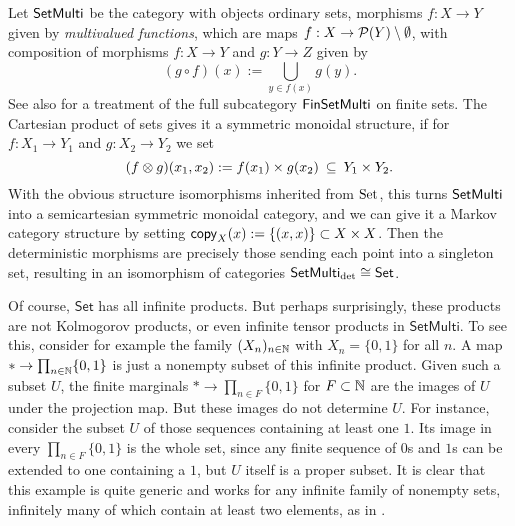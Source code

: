 \documentclass[11pt]{article}
\renewcommand{\sf}{\mathsf}
\begin{document}
\begin{example}
    \label{setmulti}
    Let $\operatorname{\mathsf{SetMulti}}$ be the category with objects ordinary sets, morphisms $f: X \to Y$ given by \emph{multivalued functions}, which are maps $f: X \to \mathcal{P}(Y)\setminus \emptyset$, with composition of morphisms $f : X \to Y$ and $g : Y \to Z$ given by
    	\begin{equation}
		\label{relational_composition}
		(g\circ f)(x) := \bigcup_{y \in f(x)} g(y).
	\end{equation}
    See also \cite[Example~2.6]{markov_cats} for a treatment of the full subcategory $\operatorname{\mathsf{FinSetMulti}}$ on finite sets.
    The Cartesian product of sets gives it a symmetric monoidal structure, if for $f : X_1 \to Y_1$ and $g: X_2 \to Y_2$ we set
	\[
	(f \otimes g)(x_1,x_2) := f(x_1) \times g(x_2) \:\subseteq\: Y_1 \times Y_2.
	\]
	With the obvious structure isomorphisms inherited from $\operatorname{Set}$, this turns $\operatorname{\mathsf{SetMulti}}$ into a semicartesian symmetric monoidal category, and we can give it a Markov category structure by setting
    $\mathsf{copy}_{X}(x) := \{(x,x)\} \subset X \times X$.
    Then the deterministic morphisms are precisely those sending each point into a singleton set, resulting in an isomorphism of categories
    $\SetMulti_\detc \cong \sf{Set}$.

    Of course, $\sf{Set}$ has all infinite products. But perhaps surprisingly, these products are not Kolmogorov products, or even infinite tensor products in $\sf{SetMulti}$.
    To see this, consider for example the family $(X_n)_{n\in\mathbb{N}}$ with $X_n = \{0,1\}$ for all $n$. 
    A map $* \to \prod_{n\in \mathbb{N}} \{0,1\}$ is just a nonempty subset of this infinite product.
    Given such a subset $U$, the finite marginals $* \to \prod_{n \in F} \{0,1\}$ for $F \subset \mathbb{N}$ are the images of $U$ under the projection map.
    But these images do not determine $U$. For instance, consider the subset $U$ of those sequences containing at least one $1$.
    Its image in every $\prod_{n \in F} \{0,1\}$ is the whole set, since any finite sequence of $0$s and $1$s can be extended to one containing a $1$, but $U$ itself is a proper subset. It is clear that this example is quite generic and works for any infinite family of nonempty sets, infinitely many of which contain at least two elements, as in .

\end{example}
\end{document}
